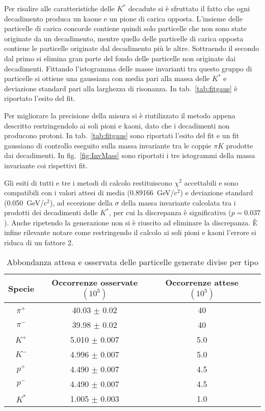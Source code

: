\documentclass[a4paper,10pt]{article}
\begin{document}
Per risalire alle caratteristiche delle $K^*$ decadute si è sfruttato il fatto che ogni decadimento produca un kaone e un pione di carica opposta. L'insieme delle particelle di carica concorde contiene quindi solo particelle che non sono state originate da un decadimento, mentre quello delle particelle di carica opposta contiene le particelle originate dal decadimento più le altre. Sottraendo il secondo dal primo si elimina gran parte del fondo delle particelle non originate dai decadimenti. Fittando l'istogramma delle masse invarianti tra questo gruppo di particelle si ottiene una gaussiana con media pari alla massa delle $K^*$ e deviazione standard pari alla larghezza di risonanza. In tab.~\ref{tab:fitgaus} è riportato l'esito del fit.

Per migliorare la precisione della misura si è riutilizzato il metodo appena descritto restringendolo ai soli pioni e kaoni, dato che i decadimenti non producono protoni. In tab.~\ref*{tab:fitgaus} sono riportati l'esito del fit e un fit gaussiano di controllo eseguito sulla massa invariante tra le coppie $\pi K$ prodotte dai decadimenti. In fig.~\ref*{fig:InvMass} sono riportati i tre istogrammi della massa invariante coi rispettivi fit.

Gli esiti di tutti e tre i metodi di calcolo restituiscono $\chi^2$ accettabili e sono compatibili con i valori attesi di media (0.89166~GeV/c$^2$) e deviazione standard (0.050~GeV/c$^2$), ad eccezione della $\sigma$ della massa invariante calcolata tra i prodotti dei decadimenti delle $K^*$, per cui la discrepanza è significativa ($p = 0.037$). Anche ripetendo la generazione non si è riuscito ad eliminare la discrepanza. È infine rilevante notare come restringendo il calcolo ai soli pioni e kaoni l'errore si riduca di un fattore 2.

\begin{table*}
  \caption{Abbondanza attesa e osservata delle particelle generate divise per tipo}
  \label{tab:abbondanza}
  \centering
  \begin{tabular}{cccc}
    \toprule
    Specie  & Occorrenze osservate $(10^5)$ & Occorrenze attese $(10^5)$ \\
    \midrule
    $\pi^+$ & 40.03 $\pm$ 0.02              & 40                         \\
    $\pi^-$ & 39.98 $\pm$ 0.02              & 40                         \\
    $K^+$   & 5.010 $\pm$ 0.007             & 5.0                        \\
    $K^-$   & 4.996 $\pm$ 0.007             & 5.0                        \\
    $p^+$   & 4.490 $\pm$ 0.007             & 4.5                        \\
    $p^-$   & 4.490 $\pm$ 0.007             & 4.5                        \\
    $K^*$   & 1.005 $\pm$ 0.003             & 1.0                        \\
    \bottomrule
  \end{tabular}
\end{table*}
\end{document}
